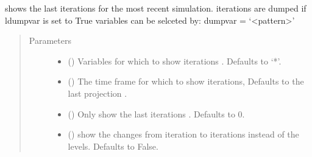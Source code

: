 \documentclass[letterpaper,10pt,english]{sphinxmanual}
\begin{document}
\begin{fulllineitems}
\begin{fulllineitems}
\label{\detokenize{index:modelclass.Solver_Mixin.show_iterations}}
\pysigstartsignatures
{}
\pysigstopsignatures
\sphinxAtStartPar
shows the last iterations for the most recent simulation.
iterations are dumped if ldumpvar is set to True
variables can be selceted by: dumpvar = ‘\textless{}pattern\textgreater{}’
\begin{quote}\begin{description}
\item[{Parameters}] \leavevmode\begin{itemize}
\item {} 
\sphinxAtStartPar
{} (\sphinxstyleliteralemphasis{\sphinxupquote{, }}) \textendash{} Variables for which to show iterations . Defaults to ‘*’.

\item {} 
\sphinxAtStartPar
{} (\sphinxstyleliteralemphasis{\sphinxupquote{, }}) \textendash{} The time frame for which to show iterations, Defaults to the last projection .

\item {} 
\sphinxAtStartPar
{} (\sphinxstyleliteralemphasis{\sphinxupquote{, }}) \textendash{} Only show the last iterations . Defaults to 0.

\item {} 
\sphinxAtStartPar
{} (\sphinxstyleliteralemphasis{\sphinxupquote{, }}) \textendash{} show the changes from iteration to iterations instead of the levels. Defaults to False.


\end{itemize}
\end{description}
\end{quote}
\end{fulllineitems}
\end{fulllineitems}
\end{document}
